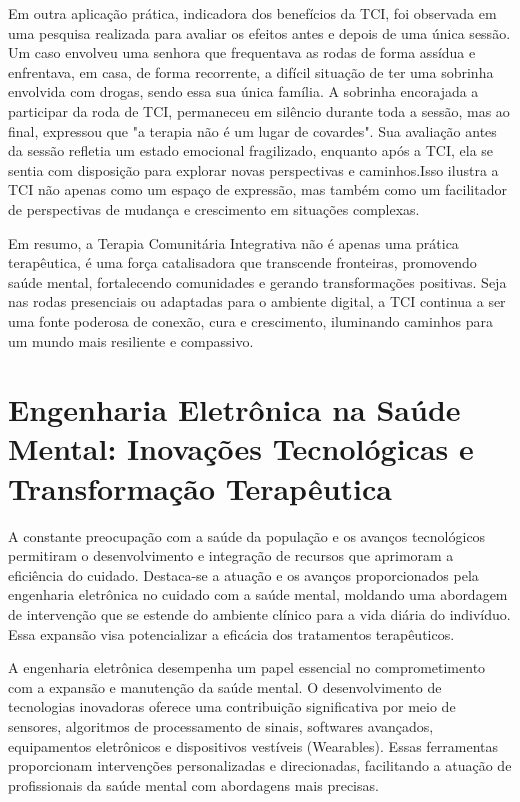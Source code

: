 Em outra aplicação prática, indicadora dos benefícios da TCI, foi observada em uma pesquisa realizada para avaliar os efeitos antes e depois de uma única sessão. Um caso envolveu uma senhora que frequentava as rodas de forma assídua e enfrentava, em casa, de forma recorrente, a difícil situação de ter uma sobrinha envolvida com drogas, sendo essa sua única família. A sobrinha encorajada a participar da roda de TCI, permaneceu em silêncio durante toda a sessão, mas ao final, expressou que "a terapia não é um lugar de covardes". Sua avaliação antes da sessão refletia um estado emocional fragilizado, enquanto após a TCI, ela se sentia com disposição para explorar novas perspectivas e caminhos.\cite{LEITEePALOS}Isso ilustra a TCI não apenas como um espaço de expressão, mas também como um facilitador de perspectivas de mudança e crescimento em situações complexas.

Em resumo, a Terapia Comunitária Integrativa não é apenas uma prática terapêutica, é uma força catalisadora que transcende fronteiras, promovendo saúde mental, fortalecendo comunidades e gerando transformações positivas. Seja nas rodas presenciais ou adaptadas para o ambiente digital, a TCI continua a ser uma fonte poderosa de conexão, cura e crescimento, iluminando caminhos para um mundo mais resiliente e compassivo.




\chapter{Engenharia Eletrônica na Saúde Mental: Inovações Tecnológicas e Transformação Terapêutica}
A constante preocupação com a saúde da população e os avanços tecnológicos permitiram o desenvolvimento e integração de recursos que aprimoram a eficiência do cuidado. Destaca-se a atuação e os avanços proporcionados pela engenharia eletrônica no cuidado com a saúde mental, moldando uma abordagem de intervenção que se estende do ambiente clínico para a vida diária do indivíduo. Essa expansão visa potencializar a eficácia dos tratamentos terapêuticos.

A engenharia eletrônica desempenha um papel essencial no comprometimento com a expansão e manutenção da saúde mental. O desenvolvimento de tecnologias inovadoras oferece uma contribuição significativa por meio de sensores, algoritmos de processamento de sinais, softwares avançados, equipamentos eletrônicos e dispositivos vestíveis (Wearables). Essas ferramentas proporcionam intervenções personalizadas e direcionadas, facilitando a atuação de profissionais da saúde mental com abordagens mais precisas.

